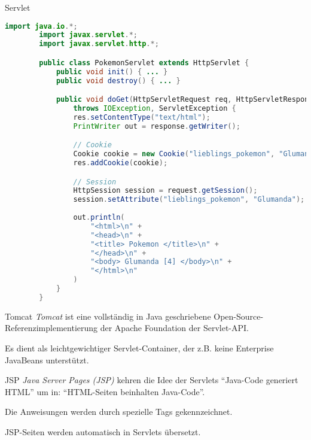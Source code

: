 \begin{example}{Servlet}
    \begin{lstlisting}[language=Java]
        import java.io.*;
        import javax.servlet.*;
        import javax.servlet.http.*;

        public class PokemonServlet extends HttpServlet {
            public void init() { ... }
            public void destroy() { ... }

            public void doGet(HttpServletRequest req, HttpServletResponse res)
                throws IOException, ServletException {
                res.setContentType("text/html");
                PrintWriter out = response.getWriter();

                // Cookie
                Cookie cookie = new Cookie("lieblings_pokemon", "Glumanda");
                res.addCookie(cookie);

                // Session
                HttpSession session = request.getSession();
                session.setAttribute("lieblings_pokemon", "Glumanda");
                
                out.println(
                    "<html>\n" +
                    "<head>\n" +
                    "<title> Pokemon </title>\n" +
                    "</head>\n" +
                    "<body> Glumanda [4] </body>\n" +
                    "</html>\n"
                )
            }
        }
    \end{lstlisting}
\end{example}

\begin{defi}{Tomcat}
    \emph{Tomcat} ist eine vollständig in Java geschriebene Open-Source-Referenzimplementierung der Apache Foundation der Servlet-API.

    Es dient als leichtgewichtiger Servlet-Container, der z.B. keine Enterprise JavaBeans unterstützt.
\end{defi}

\begin{defi}{JSP}
    \emph{Java Server Pages (JSP)} kehren die Idee der Servlets \enquote{Java-Code generiert HTML} um in: \enquote{HTML-Seiten beinhalten Java-Code}.

    Die Anweisungen werden durch spezielle Tags gekennzeichnet.

    JSP-Seiten werden automatisch in Servlets übersetzt.
\end{defi}

